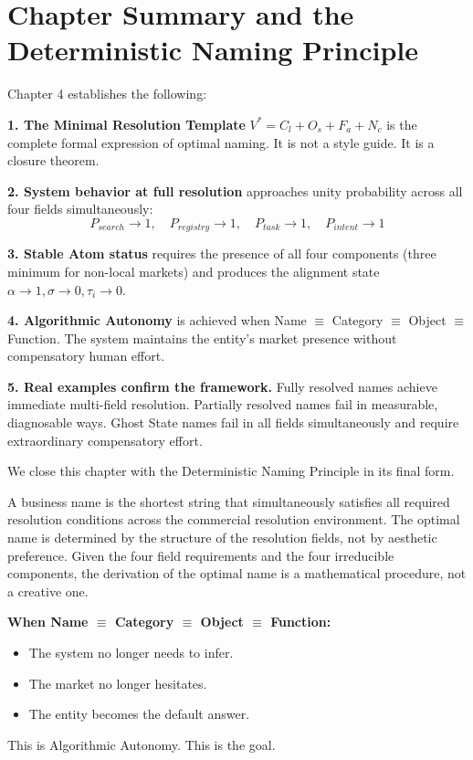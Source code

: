 \documentclass[12pt, openany]{book}
\theoremstyle{thmstyle}
\theoremstyle{defstyle}
\newcommand{\vstar}{V^{*}}
\newcommand{\Nc}{N_c}
\newcommand{\Os}{O_s}
\newcommand{\Fa}{F_a}
\newcommand{\Cl}{C_l}
\newcommand{\taui}{\tau_i}
\begin{document}
\section{Chapter Summary and the Deterministic Naming Principle}

Chapter 4 establishes the following:

\textbf{1. The Minimal Resolution Template} $\vstar = \Cl + \Os + \Fa + \Nc$ is the complete formal expression of optimal naming. It is not a style guide. It is a closure theorem.

\textbf{2. System behavior at full resolution} approaches unity probability across all four fields simultaneously:
\[
P_{search} \to 1, \quad P_{registry} \to 1, \quad P_{task} \to 1, \quad P_{intent} \to 1
\]

\textbf{3. Stable Atom status} requires the presence of all four components (three minimum for non-local markets) and produces the alignment state $\alpha \to 1, \sigma \to 0, \taui \to 0$.

\textbf{4. Algorithmic Autonomy} is achieved when Name $\equiv$ Category $\equiv$ Object $\equiv$ Function. The system maintains the entity's market presence without compensatory human effort.

\textbf{5. Real examples confirm the framework.} Fully resolved names achieve immediate multi-field resolution. Partially resolved names fail in measurable, diagnosable ways. Ghost State names fail in all fields simultaneously and require extraordinary compensatory effort.

We close this chapter with the Deterministic Naming Principle in its final form.

\begin{keybox}
A business name is the shortest string that simultaneously satisfies all required resolution conditions across the commercial resolution environment. The optimal name is determined by the structure of the resolution fields, not by aesthetic preference. Given the four field requirements and the four irreducible components, the derivation of the optimal name is a mathematical procedure, not a creative one.

\textbf{When Name $\equiv$ Category $\equiv$ Object $\equiv$ Function:}
\begin{itemize}[leftmargin=0em, label={}]
  \item The system no longer needs to infer.
  \item The market no longer hesitates.
  \item The entity becomes the default answer.
\end{itemize}

This is Algorithmic Autonomy. This is the goal.
\end{keybox}
\end{document}
